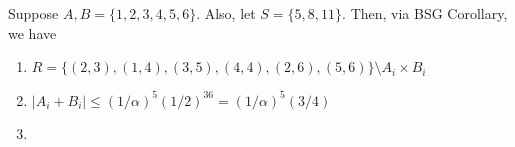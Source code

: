 \documentclass{article}
\begin{document}
Suppose $A,B = \{1,2,3,4,5,6\}$. Also, let $S = \{5,8,11\}$. Then, via BSG Corollary, we have
\begin{enumerate}
    \item $R = \{(2,3),(1,4),(3,5),(4,4),(2,6),(5,6)\} \setminus A_i \times B_i$
    \item $|A_i + B_i| \leq (1/\alpha)^5(1/2)^36 = (1/\alpha)^5(3/4)$
    \item 
\end{enumerate}

\newpage

\end{document}
